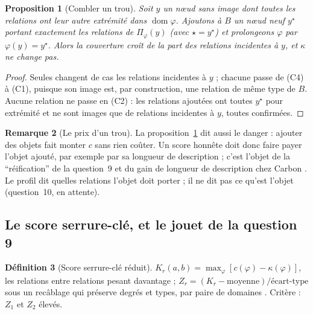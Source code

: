 \documentclass[11pt,a4paper]{article}
\theoremstyle{definition}
\newtheorem{definition}{Définition}[section]
\newtheorem{remarque}[definition]{Remarque}
\theoremstyle{plain}
\newtheorem{proposition}[definition]{Proposition}
\newcommand{\dom}{\operatorname{dom}}
\begin{document}
\begin{proposition}[Combler un trou]
\label{prop:combler}
Soit $y$ un nœud sans image dont toutes les relations ont leur autre extrémité dans $\dom\varphi$.
Ajoutons à $B$ un nœud neuf $y^\star$ portant exactement les relations de $\Pi_\varphi(y)$ (avec
$\star=y^\star$) et prolongeons $\varphi$ par $\varphi(y)=y^\star$. Alors la couverture croît de la
part des relations incidentes à $y$, et $\kappa$ ne change pas.
\end{proposition}
\begin{proof}
Seules changent de cas les relations incidentes à $y$ ; chacune passe de (C4) à (C1), puisque son
image est, par construction, une relation de même type de $B$. Aucune relation ne passe en (C2) :
les relations ajoutées ont toutes $y^\star$ pour extrémité et ne sont images que de relations
incidentes à $y$, toutes confirmées.
\end{proof}

\begin{remarque}[Le prix d'un trou]
La proposition~\ref{prop:combler} dit aussi le danger : ajouter des objets fait monter $c$ sans
rien coûter. Un score honnête doit donc faire payer l'objet ajouté, par exemple par sa longueur de
description \cite{rissanen1978} ; c'est l'objet de la \enquote{réification} de la question~9 et du
gain de longueur de description chez Carbon \cite[section~2.4]{carbon}. Le profil dit quelles
relations l'objet doit porter ; il ne dit pas ce qu'est l'objet (question~10, en attente).
\end{remarque}

\subsection{Le score serrure-clé, et le jouet de la question 9}

\begin{definition}[Score serrure-clé réduit]
$K_r(a,b)=\max_\varphi[c(\varphi)-\kappa(\varphi)]$, les relations entre relations pesant
davantage ; $Z_r=(K_r-\text{moyenne})/\text{écart-type}$ sous un recâblage qui préserve degrés et
types, par paire de domaines \cite[partie~2]{fable}. Critère : $Z_1$ et $Z_2$ élevés.
\end{definition}
\end{document}
